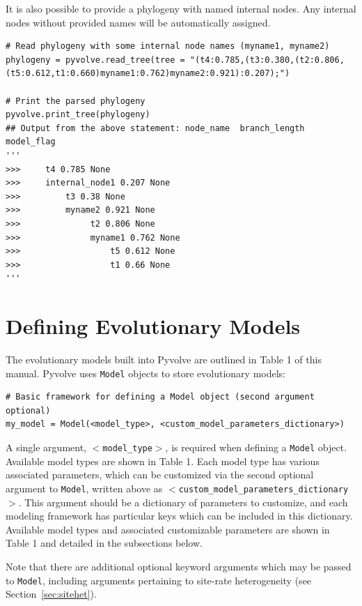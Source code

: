 \documentclass{article}
\newcommand{\code}[1]{\texttt{\small{#1}}}
\begin{document}
It is also possible to provide a phylogeny with named internal nodes. Any internal nodes without provided names will be automatically assigned.
\begin{lstlisting}
# Read phylogeny with some internal node names (myname1, myname2)
phylogeny = pyvolve.read_tree(tree = "(t4:0.785,(t3:0.380,(t2:0.806,(t5:0.612,t1:0.660)myname1:0.762)myname2:0.921):0.207);")

# Print the parsed phylogeny
pyvolve.print_tree(phylogeny)
## Output from the above statement: node_name  branch_length  model_flag
'''
>>>     t4 0.785 None
>>>     internal_node1 0.207 None
>>>         t3 0.38 None
>>>         myname2 0.921 None
>>>              t2 0.806 None
>>>              myname1 0.762 None
>>>                  t5 0.612 None
>>>                  t1 0.66 None 
'''
\end{lstlisting}

\section{Defining Evolutionary Models}\label{sec:evomodels}

The evolutionary models built into Pyvolve are outlined in Table 1 of this manual. Pyvolve uses \code{Model} objects to store evolutionary models:
\begin{lstlisting}
# Basic framework for defining a Model object (second argument optional)
my_model = Model(<model_type>, <custom_model_parameters_dictionary>)
\end{lstlisting}
A single argument, \code{$<$model\_type$>$}, is required when defining a \code{Model} object. Available model types are shown in Table 1. Each model type has various associated parameters, which can be customized via the second optional argument to \code{Model}, written above as \code{$<$custom\_model\_parameters\_dictionary$>$}. This argument should be a dictionary of parameters to customize, and each modeling framework has particular keys which can be included in this dictionary. Available model types and associated customizable parameters are shown in Table 1 and detailed in the subsections below. 

Note that there are additional optional keyword arguments which may be passed to \code{Model}, including arguments pertaining to site-rate heterogeneity (see Section~\ref{sec:sitehet}).
\end{document}
